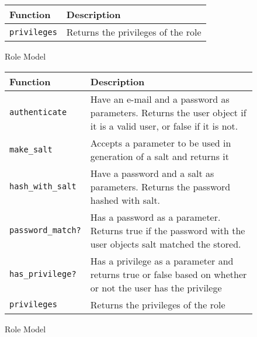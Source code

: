 \begin{figure}[htb]
\begin{center}
\begin{tabular}{ | l | p{8cm} | }
  \hline
    \textbf{Function} & \textbf{Description} \\ \hline
    \verb+privileges+ & Returns the privileges of the role \\ \hline
\end{tabular}
\caption{Role Model}
\label{tab:role_model_functions}
\end{center}
\end{figure}

\begin{figure}[htb]
\begin{center}
\begin{tabular}{ | l | p{8cm} | }
  \hline
    \textbf{Function} & \textbf{Description} \\ \hline
    \verb+authenticate+ & Have an e-mail and a password as parameters. Returns the user object if it is a valid user, or false if it is not. \\ \hline
    \verb+make_salt+ & Accepts a parameter to be used in generation of a salt and returns it \\ \hline
    \verb+hash_with_salt+ & Have a password and a salt as parameters. Returns the password hashed with salt.  \\ \hline
    \verb+password_match?+ & Has a password as a parameter. Returns true if the password with the user objects salt matched the stored. \\ \hline
    \verb+has_privilege?+ & Has a privilege as a parameter and returns true or false based on whether or not the user has the privilege \\ \hline
    \verb+privileges+ & Returns the privileges of the role \\ \hline
\end{tabular}
\caption{Role Model}
\label{tab:role_model_functions}
\end{center}
\end{figure}